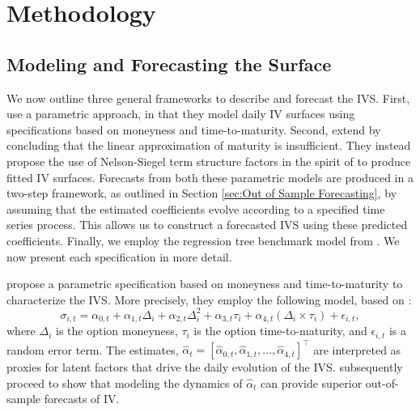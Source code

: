 \documentclass[12pt,a4paper]{article}
\begin{document}
\section{Methodology}\label{sec:Methodology}

\subsection{Modeling and Forecasting the Surface}

We now outline three general frameworks to describe and forecast the IVS. First, \cite{goncalves2006predictable} use a parametric approach, in that they model daily IV surfaces using \cite{dumas1998implied} specifications based on moneyness and time-to-maturity. Second, \cite{chalamandaris2011important} extend \cite{dumas1998implied} by concluding that the linear approximation of maturity is insufficient. They instead propose the use of Nelson-Siegel term structure factors in the spirit of \cite{diebold2006forecasting} to produce fitted IV surfaces. Forecasts from both these parametric models are produced in a two-step framework, as outlined in Section \ref{sec:Out of Sample Forecasting}, by assuming that the estimated coefficients evolve according to a specified time series process. This allows us to construct a forecasted IVS using these predicted coefficients. Finally, we employ the regression tree benchmark model from \cite{AC10}. We now present each specification in more detail.

\cite{goncalves2006predictable} propose a parametric specification based on moneyness and time-to-maturity to characterize the IVS. More precisely, they employ the following model, based on \cite{dumas1998implied}:
\[
\sigma_{i,t}=\alpha_{0,t}+\alpha_{1,t}\Delta_{i}+\alpha_{2,t}\Delta_{i}^{2}+\alpha_{3,t}\tau_{i}+\alpha_{4,t}\left(\Delta_{i}\times\tau_{i}\right)+\epsilon_{i,t},
\]
where $\Delta_{i}$ is the option moneyness, $\tau_{i}$ is the option time-to-maturity, and $\epsilon_{i,t}$ is a random error term. The estimates, $\widehat{\alpha}_{t}=\left[\widehat{\alpha}_{0,t},\widehat{\alpha}_{1,t},\ldots,\widehat{\alpha}_{4,t}\right]^{\top}$ are interpreted as proxies for latent factors that drive the daily evolution of the IVS. \cite{goncalves2006predictable} subsequently proceed to show that modeling the dynamics of $\widehat{\alpha}_{t}$ can provide superior out-of-sample forecasts of IV.
\end{document}
